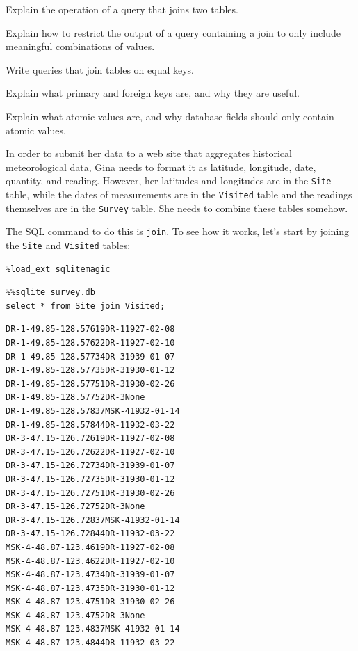 \documentclass{book}
\begin{document}
\begin{objectives}
\begin{swcitemize}
\item
  Explain the operation of a query that joins two tables.
\item
  Explain how to restrict the output of a query containing a join to
  only include meaningful combinations of values.
\item
  Write queries that join tables on equal keys.
\item
  Explain what primary and foreign keys are, and why they are useful.
\item
  Explain what atomic values are, and why database fields should only
  contain atomic values.
\end{swcitemize}
\end{objectives}

In order to submit her data to a web site that aggregates historical
meteorological data, Gina needs to format it as latitude, longitude,
date, quantity, and reading. However, her latitudes and longitudes are
in the \texttt{Site} table, while the dates of measurements are in the
\texttt{Visited} table and the readings themselves are in the
\texttt{Survey} table. She needs to combine these tables somehow.

The SQL command to do this is \texttt{join}. To see how it works, let's
start by joining the \texttt{Site} and \texttt{Visited} tables:

\begin{verbatim}
%load_ext sqlitemagic
\end{verbatim}

\begin{verbatim}
%%sqlite survey.db
select * from Site join Visited;
\end{verbatim}

\begin{verbatim}
DR-1-49.85-128.57619DR-11927-02-08
DR-1-49.85-128.57622DR-11927-02-10
DR-1-49.85-128.57734DR-31939-01-07
DR-1-49.85-128.57735DR-31930-01-12
DR-1-49.85-128.57751DR-31930-02-26
DR-1-49.85-128.57752DR-3None
DR-1-49.85-128.57837MSK-41932-01-14
DR-1-49.85-128.57844DR-11932-03-22
DR-3-47.15-126.72619DR-11927-02-08
DR-3-47.15-126.72622DR-11927-02-10
DR-3-47.15-126.72734DR-31939-01-07
DR-3-47.15-126.72735DR-31930-01-12
DR-3-47.15-126.72751DR-31930-02-26
DR-3-47.15-126.72752DR-3None
DR-3-47.15-126.72837MSK-41932-01-14
DR-3-47.15-126.72844DR-11932-03-22
MSK-4-48.87-123.4619DR-11927-02-08
MSK-4-48.87-123.4622DR-11927-02-10
MSK-4-48.87-123.4734DR-31939-01-07
MSK-4-48.87-123.4735DR-31930-01-12
MSK-4-48.87-123.4751DR-31930-02-26
MSK-4-48.87-123.4752DR-3None
MSK-4-48.87-123.4837MSK-41932-01-14
MSK-4-48.87-123.4844DR-11932-03-22
\end{verbatim}
\end{document}
